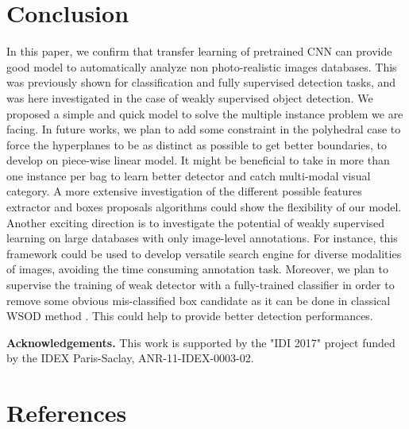 \documentclass[preprint]{elsarticle}
\begin{document}
\section{Conclusion}
\label{sec:ccl}
  In this paper, we confirm that transfer learning of pretrained CNN can provide good model to automatically analyze non photo-realistic images databases. This was previously shown for classification and fully supervised detection tasks, and was here investigated in the case of weakly supervised object detection. We proposed a simple and quick model to solve the multiple instance problem we are facing. 
  In future works, we plan to add some constraint in the polyhedral case to force the hyperplanes to be as distinct as possible to get better boundaries, to develop on piece-wise linear model. It might be beneficial to take in more than one instance per bag to learn better detector and catch multi-modal visual category. 
  A more extensive investigation of the different possible features extractor and boxes proposals algorithms could show the flexibility of our model.
  Another exciting direction is to investigate the potential of weakly supervised learning on large databases with only image-level annotations. For instance, this framework could be used to develop versatile search engine for diverse modalities of images, avoiding the time consuming annotation task.
 Moreover, we plan to supervise the training of weak detector with a fully-trained classifier in order to remove some obvious mis-classified box candidate as it can be done in classical WSOD method \cite{wan_minentropy_2018}. This could help to provide better detection performances. 
 
 
 




{\noindent \bf Acknowledgements.}
 This work is supported by the "IDI 2017" project funded by the IDEX Paris-Saclay, ANR-11-IDEX-0003-02.





\section*{References}


\end{document}
